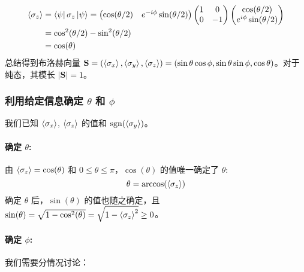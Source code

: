 \documentclass[12pt, a4paper]{article}
\begin{document}
\begin{align*}
\expval{\sigma_z} &= \bra{\psi} \sigma_z \ket{\psi} = \begin{pmatrix} \cos(\theta/2) & e^{-i\phi} \sin(\theta/2) \end{pmatrix} \begin{pmatrix} 1 & 0 \\ 0 & -1 \end{pmatrix} \begin{pmatrix} \cos(\theta/2) \\ e^{i\phi} \sin(\theta/2) \end{pmatrix} \\
&= \cos^2(\theta/2) - \sin^2(\theta/2) \\
&= \cos(\theta)
\end{align*}
总结得到布洛赫向量 \(\mathbf{S} = (\expval{\sigma_x}, \expval{\sigma_y}, \expval{\sigma_z}) = (\sin\theta \cos\phi, \sin\theta \sin\phi, \cos\theta)\)。对于纯态，其模长 \(|\mathbf{S}|=1\)。

\subsubsection*{利用给定信息确定 \(\theta\) 和 \(\phi\)}
我们已知 \(\expval{\sigma_x}\), \(\expval{\sigma_z}\) 的值和 \(\text{sgn}(\expval{\sigma_y})\)。

\paragraph{确定 \(\theta\):}
由 \(\expval{\sigma_z} = \cos(\theta)\) 和 \(0 \le \theta \le \pi\)，\(\cos(\theta)\) 的值唯一确定了 \(\theta\):
\[
\theta = \arccos(\expval{\sigma_z})
\]
确定 \(\theta\) 后，\(\sin(\theta)\) 的值也随之确定，且 \(\sin(\theta) = \sqrt{1 - \cos^2(\theta)} = \sqrt{1 - \expval{\sigma_z}^2} \ge 0\)。

\paragraph{确定 \(\phi\):}
我们需要分情况讨论：
\end{document}
